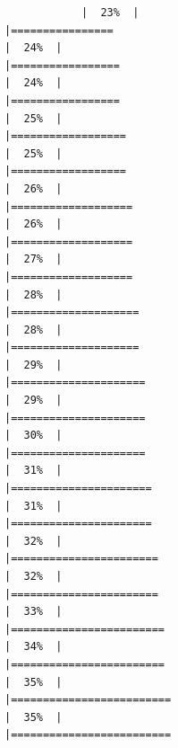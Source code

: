 \documentclass[
]{article}
\begin{document}
\begin{verbatim}
            |  23%  |                                                                              |================                                                      |  24%  |                                                                              |=================                                                     |  24%  |                                                                              |=================                                                     |  25%  |                                                                              |==================                                                    |  25%  |                                                                              |==================                                                    |  26%  |                                                                              |===================                                                   |  26%  |                                                                              |===================                                                   |  27%  |                                                                              |===================                                                   |  28%  |                                                                              |====================                                                  |  28%  |                                                                              |====================                                                  |  29%  |                                                                              |=====================                                                 |  29%  |                                                                              |=====================                                                 |  30%  |                                                                              |=====================                                                 |  31%  |                                                                              |======================                                                |  31%  |                                                                              |======================                                                |  32%  |                                                                              |=======================                                               |  32%  |                                                                              |=======================                                               |  33%  |                                                                              |========================                                              |  34%  |                                                                              |========================                                              |  35%  |                                                                              |=========================                                             |  35%  |                                                                              |=========================                                  
\end{verbatim}
\end{document}
